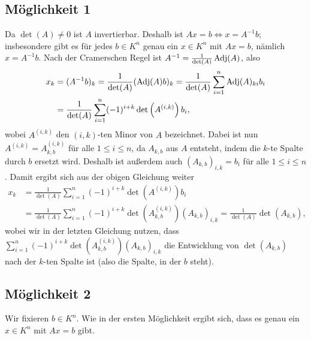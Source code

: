 \documentclass[a4paper,10pt]{article}
\begin{document}
\section{}



\subsection*{Möglichkeit 1}
Da $\det(A) \neq 0$ ist $A$ invertierbar. Deshalb ist $Ax = b \iff x = A^{-1} b$; insbesondere gibt es für jedes $b \in K^n$ genau ein $x \in K^n$ mit $Ax = b$, nämlich $x = A^{-1} b$. Nach der Cramerschen Regel ist $A^{-1} = \frac{1}{\det(A)} \operatorname{Adj}(A)$, also
\begin{align*}
 x_k
 &= (A^{-1} b)_k
 = \frac{1}{\det(A)} (\operatorname{Adj}(A) b)_k
 = \frac{1}{\det(A)} \sum_{i=1}^n \operatorname{Adj}(A)_{ki} b_i \\
 &= \frac{1}{\det(A)} \sum_{i=1}^n (-1)^{i+k} \det\left( A^{(i,k)} \right) b_i,
\end{align*}
wobei $A^{(i,k)}$ den $(i,k)$-ten Minor von $A$ bezeichnet. Dabei ist nun $A^{(i,k)} = A_{k,b}^{(i,k)}$ für alle $1 \leq i \leq n$, da $A_{k,b}$ aus $A$ entsteht, indem die $k$-te Spalte durch $b$ ersetzt wird. Deshalb ist außerdem auch $(A_{k,b})_{i,k} = b_i$ für alle $1 \leq i \leq n$. Damit ergibt sich aus der obigen Gleichung weiter
\begin{align*}
 x_k
 &= \frac{1}{\det(A)} \sum_{i=1}^n (-1)^{i+k} \det\left( A^{(i,k)} \right) b_i \\
 &= \frac{1}{\det(A)} \sum_{i=1}^n (-1)^{i+k} \det\left( A_{k,b}^{(i,k)} \right) (A_{k,b})_{i,k}
 = \frac{1}{\det(A)} \det(A_{k,b}),
\end{align*}
wobei wir in der letzten Gleichung nutzen, dass $\sum_{i=1}^n (-1)^{i+k} \det(A_{k,b}^{(i,k)}) (A_{k,b})_{i,k}$ die Entwicklung von $\det(A_{k,b})$ nach der $k$-ten Spalte ist (also die Spalte, in der $b$ steht).



\subsection*{Möglichkeit 2}
Wir fixieren $b \in K^n$. Wie in der ersten Möglichkeit ergibt sich, dass es genau ein $x \in K^n$ mit $Ax = b$ gibt.
\end{document}
